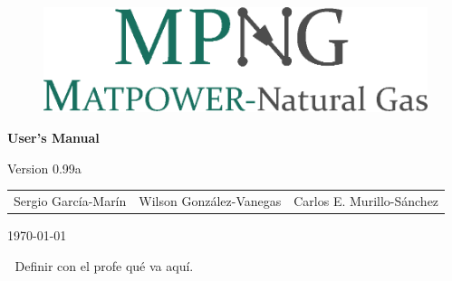 \thispagestyle{empty}

\begin{figure}[H]
    \centering
    \includegraphics[scale=0.9]{MPNG_logo.eps}
\end{figure}

\vspace{0.5cm}

\begin{center}
	\LARGE \textbf{User's Manual}
\end{center}

\vspace{0.5cm}

\begin{center}
	\Large Version 0.99a
\end{center}

\vspace{1cm}


\begin{table}[H]
	\centering
	\begin{tabular}{lcr}
		Sergio García-Marín & Wilson González-Vanegas & Carlos E. Murillo-Sánchez
	\end{tabular}
\end{table}

\vspace{0.5cm}
\begin{center}
	\today
\end{center}
		
\vspace{9cm}

\begin{center}
	{\footnotesize \textcopyright $\;$ Definir con el profe qué va aquí.}
\end{center}

\newpage